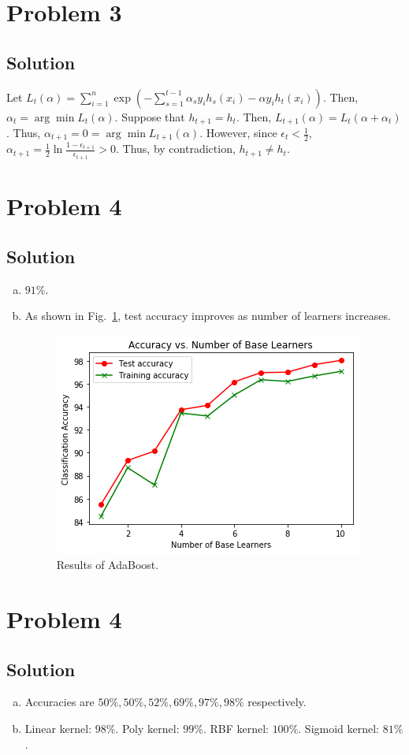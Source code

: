 \documentclass[11pt]{report}
\begin{document}
\section*{Problem 3}
\subsection*{Solution}
Let $L_t(\alpha) = \sum_{i=1}^{n} \exp\left(-\sum_{s=1}^{t-1} \alpha_s y_i h_s(x_i) - \alpha y_i h_t(x_i)\right)$. Then, $\alpha_t = \arg\min L_t(\alpha)$. Suppose that $h_{t+1} = h_t$. Then, $L_{t+1}(\alpha) = L_t(\alpha +\alpha_t)$. Thus, $\alpha_{t+1} = 0 = \arg\min L_{t+1}(\alpha)$. However, since $\epsilon_t < \frac{1}{2}$, $\alpha_{t+1} = \frac{1}{2} \ln \frac{1-\epsilon_{t+1}}{\epsilon_{t+1}} > 0$. Thus, by contradiction, $h_{t+1} \neq h_t$.
\section*{Problem 4}
\subsection*{Solution}
\begin{enumerate}[(a)]
\item $91\%$.
\item As shown in Fig.~\ref{fig:adaboost}, test accuracy improves as number of learners increases.
\begin{figure}
  \includegraphics{adaboost.png}
  \caption{Results of AdaBoost.}
  \label{fig:adaboost}
\end{figure}
\end{enumerate}
\section*{Problem 4}
\subsection*{Solution}
\begin{enumerate}[(a)]
\item Accuracies are $50\%, 50\%, 52\%, 69\%, 97\%, 98\%$ respectively.
\item Linear kernel: $98\%$. Poly kernel: $99\%$. RBF kernel: $100\%$. Sigmoid kernel: $81\%$.
\end{enumerate}
\end{document}
